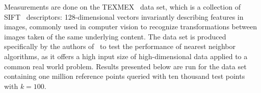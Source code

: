   Measurements are done on the TEXMEX~\cite{jegou2011} data set, which is 
  a collection of SIFT~\cite{lowe1999a,lowe2004a} descriptors: 128-dimensional 
  vectors invariantly describing features in images, commonly used in computer 
  vision to recognize transformations between images taken of the same 
  underlying content. The data set is produced specifically by the authors 
  of~\cite{jegou2011} to test the performance of nearest neighbor algorithms, 
  as it offers a high input size of
  high-dimensional data applied to a common real world problem. Results 
  presented below are run for the data set containing one million reference 
  points queried with ten thousand test points with $k=100$.  


